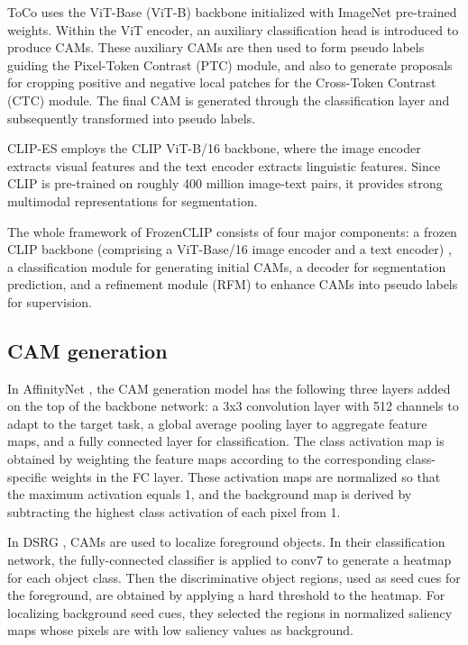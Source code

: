 ToCo \cite{wsss_toco_token_contrast} uses the ViT-Base (ViT-B) backbone initialized with ImageNet pre-trained weights. Within the ViT encoder, an auxiliary classification head is introduced to produce CAMs. These auxiliary CAMs are then used to form pseudo labels guiding the Pixel-Token Contrast (PTC) module, and also to generate proposals for cropping positive and negative local patches for the Cross-Token Contrast (CTC) module. The final CAM is generated through the classification layer and subsequently transformed into pseudo labels.

CLIP-ES \cite{wsss_clip_es} employs the CLIP ViT-B/16 backbone, where the image encoder extracts visual features and the text encoder extracts linguistic features. Since CLIP is pre-trained on roughly 400 million image-text pairs, it provides strong multimodal representations for segmentation.

The whole framework of FrozenCLIP \cite{wsss_frozen_clip} consists of four major components: a frozen CLIP backbone (comprising a ViT-Base/16 image encoder and a text encoder) \cite{transformer_vit}, a classification module for generating initial CAMs, a decoder for segmentation prediction, and a refinement module (RFM) to enhance CAMs into pseudo labels for supervision.

\subsection{CAM generation}
\label{subsec:cam-generation}
In AffinityNet \cite{wsss_affinitynet}, the CAM generation model has the following three layers added on the top of the backbone network: a 3x3 convolution layer with 512 channels to adapt to the target task, a global average pooling layer to aggregate feature maps, and a fully connected layer for classification. The class activation map is obtained by weighting the feature maps according to the corresponding class-specific weights in the FC layer.  These activation maps are normalized so that the maximum activation equals 1, and the background map is derived by subtracting the highest class activation of each pixel from 1.

In DSRG \cite{wsss_dsrg_deep_seeded_region_growing}, CAMs \cite{cam} are used to localize foreground objects.  In their classification network, the fully-connected classifier is applied to conv7 to generate a heatmap for each object class. Then the discriminative object regions, used as seed cues for the foreground, are obtained by applying a hard threshold to the heatmap. For localizing background seed cues, they selected the regions in normalized saliency maps whose pixels are with low saliency values as background.

